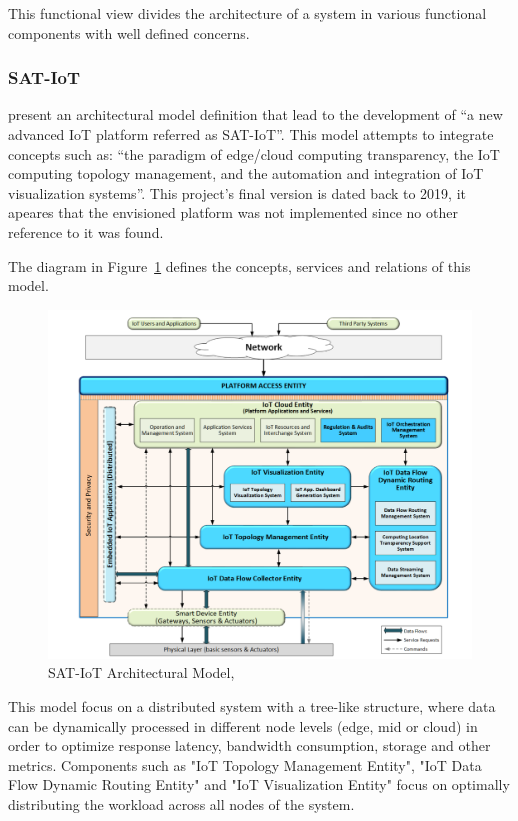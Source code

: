 This functional view divides the architecture of a system in various functional components with well defined concerns.

\subsubsection{SAT-IoT}
\label{subsubsec:stateofart:arch:sat}

\cite{8767282} present an architectural model definition that lead to the development of ``a new advanced \gls{IoT} platform referred as SAT-IoT''. This model attempts to integrate concepts such as:  ``the paradigm of edge/cloud computing transparency, the IoT computing topology management, and the automation and integration of IoT visualization systems''. This project's final version is dated back to 2019, it apeares that the envisioned platform was not implemented since no other reference to it was found.

The diagram in Figure~\ref{fig:stateofart:arch:sat:model} defines the concepts, services and relations of this model.

\begin{figure}[H]
    \centering
    \includegraphics[scale=0.4]{
        assets/figures/sat-iot.png
    }
    \caption[SAT-IoT Architectural Model]{SAT-IoT Architectural Model, \cite{8767282}}
    \label{fig:stateofart:arch:sat:model}
\end{figure}

This model focus on a distributed system with a tree-like structure, where data can be dynamically processed in different node levels (edge, mid or cloud) in order to optimize response latency, bandwidth consumption, storage and other metrics. Components such as "IoT Topology Management Entity", "IoT Data Flow Dynamic Routing Entity" and "IoT Visualization Entity" focus on optimally distributing the workload across all nodes of the system.

